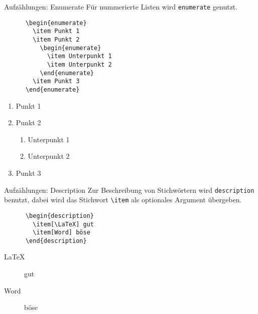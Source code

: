 \begin{frame}[fragile]{Aufzählungen: Enumerate}
  Für nummerierte Listen wird \texttt{enumerate} genutzt.
  \begin{CodeExample}{0.48}
    \begin{lstlisting}
      \begin{enumerate}
        \item Punkt 1
        \item Punkt 2
          \begin{enumerate}
            \item Unterpunkt 1
            \item Unterpunkt 2
          \end{enumerate}
        \item Punkt 3
      \end{enumerate}
    \end{lstlisting}
  \CodeResult
    \begin{minipage}[c][9\baselineskip][c]{\textwidth}
      \begin{enumerate}
        \item Punkt 1
        \item Punkt 2
          \begin{enumerate}
            \item Unterpunkt 1
            \item Unterpunkt 2
          \end{enumerate}
        \item Punkt 3
      \end{enumerate}
    \end{minipage}
  \end{CodeExample}
\end{frame}

\begin{frame}[fragile]{Aufzählungen: Description}
  Zur Beschreibung von Stichwörtern wird \texttt{description} benutzt, dabei wird das
Stichwort \lstinline+\item+ als optionales Argument übergeben.
  \begin{CodeExample}{0.48}
    \begin{lstlisting}
      \begin{description}
        \item[\LaTeX] gut
        \item[Word] böse
      \end{description}
    \end{lstlisting}
  \CodeResult
    \begin{minipage}[c][4\baselineskip][c]{\textwidth}
      \begin{description}
        \item[\LaTeX] gut
        \item[Word] böse
      \end{description}
    \end{minipage}
  \end{CodeExample}
\end{frame}
